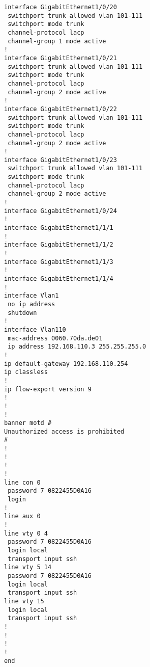 \documentclass[14pt, a4paper]{extarticle}
\begin{document}
\begin{appendices}
\begin{lstlisting}[caption=Конфигурация устройства SW\_3\_L2\_IVANOV\label{list:conf_sw3_l2}]
interface GigabitEthernet1/0/20
 switchport trunk allowed vlan 101-111
 switchport mode trunk
 channel-protocol lacp
 channel-group 1 mode active
!
interface GigabitEthernet1/0/21
 switchport trunk allowed vlan 101-111
 switchport mode trunk
 channel-protocol lacp
 channel-group 2 mode active
!
interface GigabitEthernet1/0/22
 switchport trunk allowed vlan 101-111
 switchport mode trunk
 channel-protocol lacp
 channel-group 2 mode active
!
interface GigabitEthernet1/0/23
 switchport trunk allowed vlan 101-111
 switchport mode trunk
 channel-protocol lacp
 channel-group 2 mode active
!
interface GigabitEthernet1/0/24
!
interface GigabitEthernet1/1/1
!
interface GigabitEthernet1/1/2
!
interface GigabitEthernet1/1/3
!
interface GigabitEthernet1/1/4
!
interface Vlan1
 no ip address
 shutdown
!
interface Vlan110
 mac-address 0060.70da.de01
 ip address 192.168.110.3 255.255.255.0
!
ip default-gateway 192.168.110.254
ip classless
!
ip flow-export version 9
!
!
!
banner motd #
Unauthorized access is prohibited
#
!
!
!
!
line con 0
 password 7 0822455D0A16
 login
!
line aux 0
!
line vty 0 4
 password 7 0822455D0A16
 login local
 transport input ssh
line vty 5 14
 password 7 0822455D0A16
 login local
 transport input ssh
line vty 15
 login local
 transport input ssh
!
!
!
!
end

\end{lstlisting}


\end{appendices}
\end{document}
